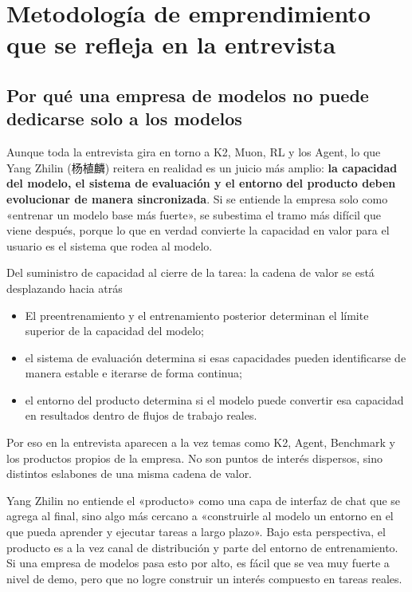 \section{Metodología de emprendimiento que se refleja en la entrevista}

\subsection{Por qué una empresa de modelos no puede dedicarse solo a los modelos}
Aunque toda la entrevista gira en torno a K2, Muon, RL y los Agent, lo que Yang Zhilin (杨植麟) reitera en realidad es un juicio más amplio: \textbf{la capacidad del modelo, el sistema de evaluación y el entorno del producto deben evolucionar de manera sincronizada}. Si se entiende la empresa solo como «entrenar un modelo base más fuerte», se subestima el tramo más difícil que viene después, porque lo que en verdad convierte la capacidad en valor para el usuario es el sistema que rodea al modelo.

\begin{importantbox}{Del suministro de capacidad al cierre de la tarea: la cadena de valor se está desplazando hacia atrás}
\begin{itemize}
    \item El preentrenamiento y el entrenamiento posterior determinan el límite superior de la capacidad del modelo;
    \item el sistema de evaluación determina si esas capacidades pueden identificarse de manera estable e iterarse de forma continua;
    \item el entorno del producto determina si el modelo puede convertir esa capacidad en resultados dentro de flujos de trabajo reales.
\end{itemize}
Por eso en la entrevista aparecen a la vez temas como K2, Agent, Benchmark y los productos propios de la empresa. No son puntos de interés dispersos, sino distintos eslabones de una misma cadena de valor.
\end{importantbox}

Yang Zhilin no entiende el «producto» como una capa de interfaz de chat que se agrega al final, sino algo más cercano a «construirle al modelo un entorno en el que pueda aprender y ejecutar tareas a largo plazo». Bajo esta perspectiva, el producto es a la vez canal de distribución y parte del entorno de entrenamiento. Si una empresa de modelos pasa esto por alto, es fácil que se vea muy fuerte a nivel de demo, pero que no logre construir un interés compuesto en tareas reales.

